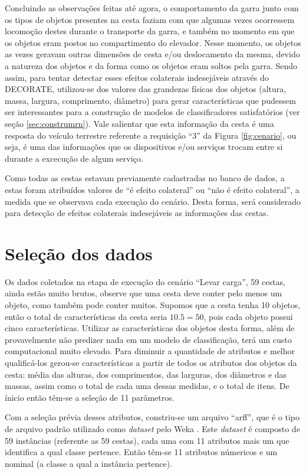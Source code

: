 Concluindo as observações feitas até agora, o comportamento da garra junto com os tipos de objetos presentes na cesta faziam com que algumas vezes ocorressem locomoção destes durante o transporte da garra, e também no momento em que os objetos eram postos no compartimento do elevador. Nesse momento, os objetos as vezes geravam outras dimensões de cesta e/ou deslocamento da mesma, devido a natureza dos objetos e da forma como os objetos eram soltos pela garra. Sendo assim, para tentar detectar esses efeitos colaterais indesejáveis através do DECORATE, utilizou-se dos valores das grandezas físicas dos objetos (altura, massa, largura, comprimento, diâmetro) para gerar características que pudessem ser interessantes para a construção de modelos de classificadores satisfatórios (ver seção \ref{sec:construmrn}). Vale salientar que esta informação da cesta é uma resposta do veículo terrestre referente a requisição ``3'' da Figura \ref{fig:cenario}, ou seja, é uma das informações que os dispositivos e/ou serviços trocam entre si durante a excecução de algum serviço.

Como todas as cestas estavam previamente cadastradas no banco de dados, a estas foram atribuídos valores de ``é efeito colateral'' ou ``não é efeito colateral'', a medida que se observava cada execução do cenário. Desta forma, será considerado para detecção de efeitos colaterais indesejáveis as informações das cestas.

\section{Seleção dos dados}
Os dados coletados na etapa de execução do cenário ``Levar carga'', 59 cestas, ainda estão muito brutos, observe que uma cesta deve conter pelo menos um objeto, como também pode conter muitos. Supomos que a cesta tenha 10 objetos, então o total de características da cesta seria $10.5=50$, pois cada objeto possui cinco características. Utilizar as características dos objetos desta forma, além de provavelmente não predizer nada em um modelo de classificação, terá um custo computacional muito elevado. Para diminuir a quantidade de atributos e melhor qualificá-los gerou-se características a partir de todos os atributos dos objetos da cesta: média das alturas, dos comprimentos, das larguras, dos diâmetros e das massas, assim como o total de cada uma dessas medidas, e o total de itens. De ínicio então têm-se a seleção de 11 parâmetros.

Com a seleção prévia desses atributos, constriu-se um arquivo ``arff'', que é o tipo de arquivo padrão utilizado como \textit{dataset} pelo Weka \cite{Hall:2009}. Este \textit{dataset} é composto de 59 instâncias (referente as 59 cestas), cada uma com 11 atributos mais um que identifica a qual classe pertence. Então têm-se 11 atributos númericos e um nominal (a classe a qual a instância pertence).

